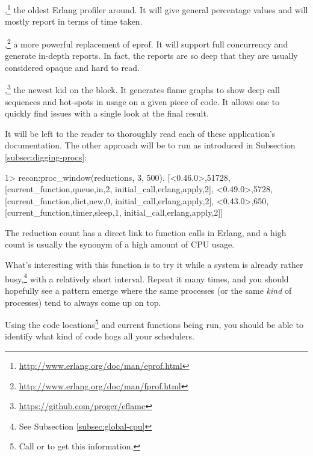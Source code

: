 \documentclass[11pt, oneside]{book}   	%
\begin{document}
\begin{itemize*}
	\item {},\footnote{\href{http://www.erlang.org/doc/man/eprof.html}{http://www.erlang.org/doc/man/eprof.html}} the oldest Erlang profiler around. It will give general percentage values and will mostly report in terms of time taken.
	\item {},\footnote{\href{http://www.erlang.org/doc/man/fprof.html}{http://www.erlang.org/doc/man/fprof.html}} a more powerful replacement of eprof. It will support full concurrency and generate in-depth reports. In fact, the reports are so deep that they are usually considered opaque and hard to read. 
	\item {},\footnote{\href{https://github.com/proger/eflame}{https://github.com/proger/eflame}} the newest kid on the block. It generates flame graphs to show deep call sequences and hot-spots in usage on a given piece of code. It allows one to quickly find issues with a single look at the final result.
\end{itemize*}

It will be left to the reader to thoroughly read each of these application's documentation. The other approach will be to run  as introduced in Subsection \ref{subsec:digging-procs}:

\begin{VerbatimEshell}
1> recon:proc_window(reductions, 3, 500).
[{<0.46.0>,51728,
  [{current_function,{queue,in,2}},
   {initial_call,{erlang,apply,2}}]},
 {<0.49.0>,5728,
  [{current_function,{dict,new,0}},
   {initial_call,{erlang,apply,2}}]},
 {<0.43.0>,650,
  [{current_function,{timer,sleep,1}},
   {initial_call,{erlang,apply,2}}]}]
\end{VerbatimEshell}

The reduction count has a direct link to function calls in Erlang, and a high count is usually the synonym of a high amount of CPU usage. 

What's interesting with this function is to try it while a system is already rather busy,\footnote{See Subsection \ref{subsec:global-cpu}} with a relatively short interval. Repeat it many times, and you should hopefully see a pattern emerge where the same processes (or the same \emph{kind} of processes) tend to always come up on top.

Using the code locations\footnote{Call  or  to get this information.} and current functions being run, you should be able to identify what kind of code hogs all your schedulers.
\end{document}
